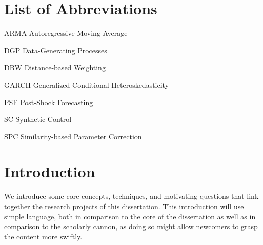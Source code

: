 \documentclass{uiucthesis2021}
\theoremstyle{definition}
\begin{document}


{
    \hypersetup{linkcolor=black}  %
    \tableofcontents
}

\chapter{List of Abbreviations}

\begin{abbrevlist}
\item[ARMA] Autoregressive Moving Average
\item[DGP] Data-Generating Processes
\item[DBW] Distance-based Weighting
\item[GARCH] Generalized Conditional Heteroskedasticity
\item[PSF] Post-Shock Forecasting
\item[SC] Synthetic Control
\item[SPC] Similarity-based Parameter Correction
\end{abbrevlist}



\mainmatter

\chapter{Introduction}

We introduce some core concepts, techniques, and motivating questions that link together the research projects of this dissertation.  This introduction will use simple language, both in comparison to the core of the dissertation as well as in comparison to the scholarly cannon, as doing so might allow newcomers to grasp the content more swiftly.  
\end{document}

